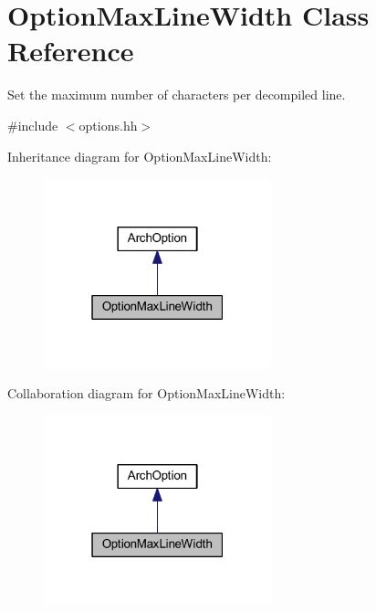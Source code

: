 \hypertarget{class_option_max_line_width}{}\section{Option\+Max\+Line\+Width Class Reference}
\label{class_option_max_line_width}


Set the maximum number of characters per decompiled line.  




{\ttfamily \#include $<$options.\+hh$>$}



Inheritance diagram for Option\+Max\+Line\+Width\+:
\nopagebreak
\begin{figure}[H]
\begin{center}
\leavevmode
\includegraphics[width=187pt]{class_option_max_line_width__inherit__graph}
\end{center}
\end{figure}


Collaboration diagram for Option\+Max\+Line\+Width\+:
\nopagebreak
\begin{figure}[H]
\begin{center}
\leavevmode
\includegraphics[width=187pt]{class_option_max_line_width__coll__graph}
\end{center}
\end{figure}
